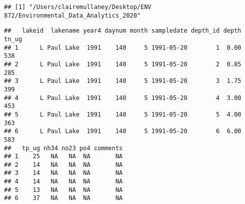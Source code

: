 \documentclass[]{article}
\newenvironment{Shaded}{\begin{snugshade}}{\end{snugshade}}
\newcommand{\CommentTok}[1]{\textcolor[rgb]{0.56,0.35,0.01}{\textit{#1}}}
\newcommand{\KeywordTok}[1]{\textcolor[rgb]{0.13,0.29,0.53}{\textbf{#1}}}
\newcommand{\NormalTok}[1]{#1}
\newcommand{\OperatorTok}[1]{\textcolor[rgb]{0.81,0.36,0.00}{\textbf{#1}}}
\newcommand{\StringTok}[1]{\textcolor[rgb]{0.31,0.60,0.02}{#1}}
\begin{document}
\begin{Shaded}
\end{Shaded}

\begin{verbatim}
## [1] "/Users/clairemullaney/Desktop/ENV 872/Environmental_Data_Analytics_2020"
\end{verbatim}

\begin{Shaded}
\end{Shaded}

\begin{verbatim}
##   lakeid  lakename year4 daynum month sampledate depth_id depth tn_ug
## 1      L Paul Lake  1991    140     5 1991-05-20        1  0.00   538
## 2      L Paul Lake  1991    140     5 1991-05-20        2  0.85   285
## 3      L Paul Lake  1991    140     5 1991-05-20        3  1.75   399
## 4      L Paul Lake  1991    140     5 1991-05-20        4  3.00   453
## 5      L Paul Lake  1991    140     5 1991-05-20        5  4.00   363
## 6      L Paul Lake  1991    140     5 1991-05-20        6  6.00   583
##   tp_ug nh34 no23 po4 comments
## 1    25   NA   NA  NA       NA
## 2    14   NA   NA  NA       NA
## 3    14   NA   NA  NA       NA
## 4    14   NA   NA  NA       NA
## 5    13   NA   NA  NA       NA
## 6    37   NA   NA  NA       NA
\end{verbatim}

\begin{Shaded}
\end{Shaded}
\end{document}
